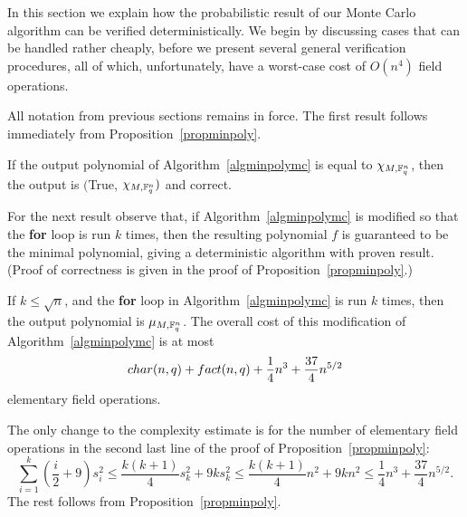In this section we explain how the probabilistic result of our Monte
Carlo algorithm can be verified deterministically. We begin by
discussing cases that can be handled rather cheaply, before we present
several general verification procedures, all of which, unfortunately,
have a worst-case cost of $O(n^4)$ field operations.

All notation from previous sections remains in force. The first result 
follows immediately from Proposition~\ref{propminpoly}.

\begin{Prop}
If the output polynomial of Algorithm~\ref{algminpolymc} is equal to 
$\chi_{M,\mathbb{F}_q^n}$, then the output is $(${\sc True}, $\chi_{M,\mathbb{F}_q^n})$
and correct.
\end{Prop}

For the next result observe that, if Algorithm~\ref{algminpolymc} 
is modified so that the {\bf for} loop is run $k$ times, then the resulting 
polynomial $f$ is guaranteed to be the minimal polynomial, giving a deterministic
algorithm with proven result. (Proof of correctness 
is given in the proof of Proposition~\ref{propminpoly}.)

\begin{Prop}
\label{veryfewvectors}
If $k \le \sqrt{n}$,  and the {\bf for} loop in 
Algorithm~\ref{algminpolymc} is run $k$ times, then the output polynomial
is $\mu_{M,\mathbb{F}_q^n}$. The 
overall cost of this modification of Algorithm~\ref{algminpolymc} is at most
\[ {\rm char}(n,q) + {\rm fact}(n,q) + \frac{1}{4}n^3+\frac{37}{4} n^{5/2} \]
elementary field operations.
\end{Prop}
\proofbeg The only change 
to the complexity estimate is for the number of elementary field operations 
in the second last line of the proof of Proposition~\ref{propminpoly}:
\[
\sum_{i=1}^k(\frac{i}{2}+9)s_i^2 \leq \frac{k(k+1)}{4}s_k^2+9ks_k^2
\leq \frac{k(k+1)}{4}n^2+9kn^2\le \frac{1}{4}n^3+\frac{37}{4} n^{5/2}.
\]
The rest follows from Proposition~\ref{propminpoly}.
\proofend

